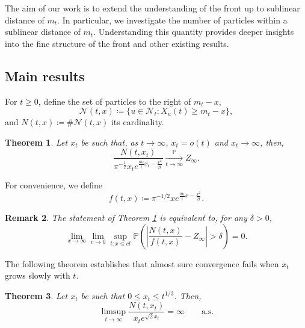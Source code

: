 \documentclass{article}
\newtheorem{theorem}{Theorem}[section]
\newtheorem{remark}[theorem]{Remark}
\newcommand{\Prob}{\mathbb{P}}
\begin{document}
The aim of our work is to extend the understanding of the front up to sublinear distance of $m_t$. In particular, we investigate the number of particles within a sublinear distance of $m_t$. Understanding this quantity provides deeper insights into the fine structure of the front and other existing results.\\

\subsection{Main results}\label{sub:mainresult}
For $t\geq 0$, define the set of particles to the right of $m_t-x$,
\begin{equation}
    \mathcal{N}(t,x) \coloneqq  \{u\in \mathcal{N}_t : X_u(t) \geq m_t -x\},
\end{equation}
and $N(t,x)\coloneqq \#\mathcal{N}(t,x)$ its cardinality.

\begin{theorem}\label{th:1}
    Let $x_t$ be such that, as $t\to \infty$, $x_t=o(t)$ and $x_t\rightarrow \infty$, then,
\begin{equation}
  \frac{ N(t,x_t)}{\pi^{-\frac{1}{2}}  x_t e^{\frac{m_t}{t}x_t - \frac{x^2}{2t}} } \xrightarrow[t\rightarrow \infty]{\mathbb{P}} Z_\infty.
\end{equation}

\end{theorem}
For convenience, we define  
\[
    f(t, x) \coloneqq \pi^{-1/2} x e^{ \frac{m_t}{t}x - \frac{x^2}{2t} }.
\]

\begin{remark}\label{re:rkconj}
The statement of Theorem \ref{th:1} is equivalent to, for any $\delta>0$,
    \begin{equation}
        \lim_{x\to \infty}\lim_{c\to 0}\sup_{t : x\leq ct}\Prob\left(\left|\frac{N(t,x)}{f(t,x)} -Z_\infty \right|>\delta \right) =0.
    \end{equation}    
\end{remark}



The following theorem establishes that almost sure convergence fails when \( x_t \) grows slowly with \( t \).
\begin{theorem}\label{thm1:2}
    Let \( x_t \) be such that \( 0\leq x_t \leq t^{1/3} \). Then,
    \begin{equation}
        \limsup_{t \to \infty} \frac{N(t, x_t)}{x_t e^{\sqrt{2}x_t}} = \infty \qquad \text{a.s.}
    \end{equation}    
\end{theorem}
\end{document}
